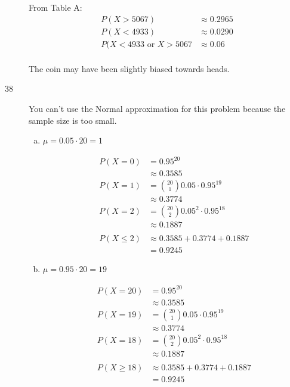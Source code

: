 \documentclass[letterpaper, landscape]{exam}
\begin{document}
\begin{description}
        From Table A:
        \begin{align*}
          P(X > 5067) & \approx 0.2965 \\
          P(X < 4933) & \approx 0.0290 \\
          P(X < 4933 \text{ or } X > 5067 &\approx \boxed{ 0.06 } \\
        \end{align*}

        The coin may have been slightly biased towards heads.

      \item[38]
        You can't use the Normal approximation for this problem because the
        sample size is too small.

        \begin{enumerate}[(a)]
          \item 
            $\mu = 0.05 \cdot 20 = \boxed{ 1 }$

            \begin{align*}
              P(X = 0) & = 0.95^{20} \\
                       & \approx 0.3585 \\
              P(X = 1) & = \binom{20}{1} 0.05 \cdot 0.95^{19} \\
                       & \approx 0.3774 \\
              P(X = 2) & = \binom{20}{2} 0.05^2 \cdot 0.95^{18} \\
                       & \approx 0.1887 \\
                       \\
              P(X \leq 2) & \approx 0.3585 + 0.3774 + 0.1887 \\
                          & = \boxed{ 0.9245 }
            \end{align*}

          \item 
            $\mu = 0.95 \cdot 20 = \boxed{ 19 }$

            \begin{align*}
              P(X = 20) & = 0.95^{20} \\
                        & \approx 0.3585 \\
              P(X = 19) & = \binom{20}{1} 0.05 \cdot 0.95^{19} \\
                        & \approx 0.3774 \\
              P(X = 18) & = \binom{20}{2} 0.05^2 \cdot 0.95^{18} \\
                        & \approx 0.1887 \\
                       \\
              P(X \geq 18) & \approx 0.3585 + 0.3774 + 0.1887 \\
                           & = \boxed{ 0.9245 }
            \end{align*}


\end{enumerate}
\end{description}
\end{document}
